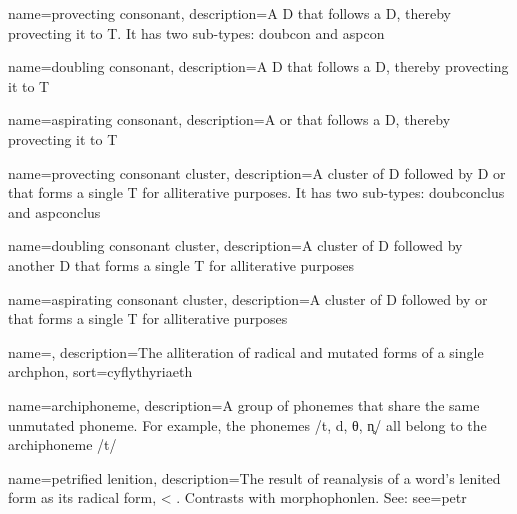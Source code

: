\usepackage[%
            xindy,
            toc,
            acronym
            ]{glossaries}
\usepackage{glossary-mcols}

\makeglossaries
\usepackage[xindy]{imakeidx}
\makeindex


{
    name=provecting consonant,
    description={A \gls{D} that follows a \gls{D}, thereby provecting it to \gls{T}. It has two sub-types: \gls{doubcon} and \gls{aspcon}}
}

{
    name=doubling consonant,
    description={A \gls{D} that follows a \gls{D}, thereby provecting it to \gls{T}}
}

{
    name=aspirating consonant,
    description={A  or  that follows a \gls{D}, thereby provecting it to \gls{T}}
}

{
    name=provecting consonant cluster,
    description={A cluster of \gls{D} followed by \gls{D} or  that forms a single \gls{T} for alliterative purposes. It has two sub-types: \gls{doubconclus} and \gls{aspconclus}}
}

{
    name=doubling consonant cluster,
    description={A cluster of \gls{D} followed by another \gls{D} that forms a single \gls{T} for alliterative purposes}
}

{
    name=aspirating consonant cluster,
    description={A cluster of \gls{D} followed by  or  that forms a single \gls{T} for alliterative purposes}
}

{
    name={},
    description={The alliteration of radical and mutated forms of a single \gls{archphon}},
    sort={cyflythyriaeth}
}

{
    name={archi\-phoneme},
    description={A group of phonemes that share the same unmutated phoneme. For example, the phonemes /t, d, θ, n̥/ all belong to the archiphoneme /t/}
  }


{
  name={petrified lenition},
  description={The result of reanalysis of a word's lenited form as its radical form, \eg {} < . Contrasts with \gls{morphophonlen}. See: }
  see={petr}
}

